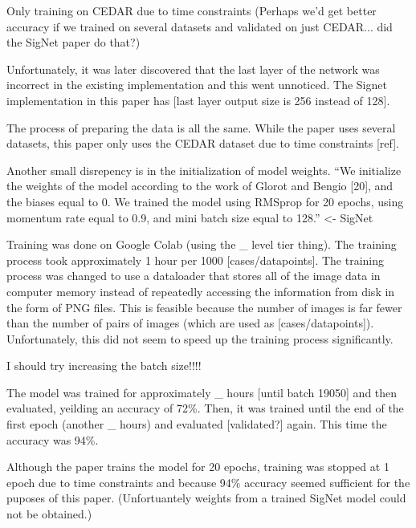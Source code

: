 Only training on CEDAR due to time constraints
(Perhaps we'd get better accuracy if we trained on several datasets and validated on just CEDAR... did the SigNet paper do that?)


Unfortunately, it was later discovered that the last layer of the network was incorrect in the existing implementation and this went unnoticed.
The Signet implementation in this paper has [last layer output size is 256 instead of 128].

The process of preparing the data is all the same.
While the paper uses several datasets, this paper only uses the CEDAR dataset due to time constraints [ref].

Another small disrepency is in the initialization of model weights.
``We initialize the weights of the model according to the work
of Glorot and Bengio [20], and the biases equal to 0. We trained
the model using RMSprop for 20 epochs, using momentum rate
equal to 0.9, and mini batch size equal to 128.'' <- SigNet

Training was done on Google Colab (using the \_ level tier thing).
The training process took approximately 1 hour per 1000 [cases/datapoints].
The training process was changed to use a dataloader that stores all of the image data in computer memory instead of repeatedly accessing the information from disk in the form of PNG files.
This is feasible because the number of images is far fewer than the number of pairs of images (which are used as [cases/datapoints]).
Unfortunately, this did not seem to speed up the training process significantly.

I should try increasing the batch size!!!!

The model was trained for approximately \_ hours [until batch 19050] and then evaluated, yeilding an accuracy of 72\%.
Then, it was trained until the end of the first epoch (another \_ hours) and evaluated [validated?] again.
This time the accuracy was 94\%.

Although the paper trains the model for 20 epochs, training was stopped at 1 epoch due to time constraints and because 94\% accuracy seemed sufficient for the puposes of this paper.
(Unfortuantely weights from a trained SigNet model could not be obtained.)

